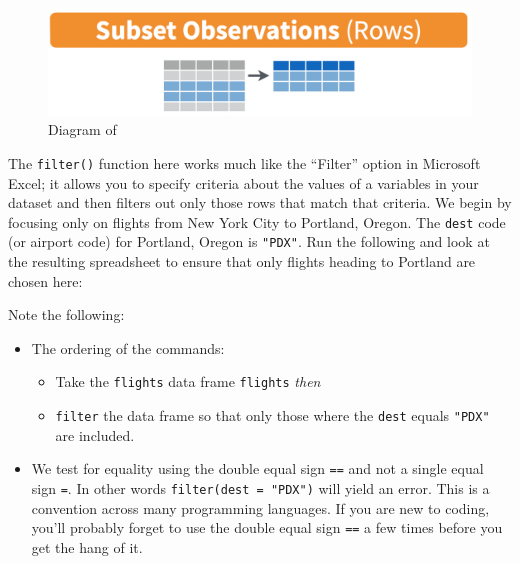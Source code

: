\documentclass[12pt, krantz2,]{krantz}
\makeatletter
\newenvironment{Shaded}{\begin{snugshade}}{\end{snugshade}}
\newcommand{\KeywordTok}[1]{\textcolor[rgb]{0.27,0.27,0.27}{\textbf{#1}}}
\newcommand{\NormalTok}[1]{#1}
\newcommand{\OperatorTok}[1]{\textcolor[rgb]{0.43,0.43,0.43}{\textbf{#1}}}
\newcommand{\StringTok}[1]{\textcolor[rgb]{0.5,0.5,0.5}{#1}}
\providecommand{\tightlist}{%
  \setlength{\itemsep}{0pt}\setlength{\parskip}{0pt}}
\newenvironment{kframe}{%
\medskip{}
\setlength{\fboxsep}{.8em}
 \def\at@end@of@kframe{}%
 \ifinner\ifhmode%
  \def\at@end@of@kframe{\end{minipage}}%
  \begin{minipage}{\columnwidth}%
 \fi\fi%
 \def\FrameCommand##1{\hskip\@totalleftmargin \hskip-\fboxsep
 \colorbox{shadecolor}{##1}\hskip-\fboxsep
     \hskip-\linewidth \hskip-\@totalleftmargin \hskip\columnwidth}%
 \MakeFramed {\advance\hsize-\width
   \@totalleftmargin\z@ \linewidth\hsize
   \@setminipage}}%
 {\par\unskip\endMakeFramed%
 \at@end@of@kframe}
\renewenvironment{Shaded}{\begin{kframe}}{\end{kframe}}
\makeatother
\begin{document}
\begin{figure}

{\centering \includegraphics[width=\textwidth]{images/filter} 

}

\caption{Diagram of }\label{fig:filter}
\end{figure}

The \texttt{filter()} function here works much like the ``Filter'' option in Microsoft Excel; it allows you to specify criteria about the values of a variables in your dataset and then filters out only those rows that match that criteria. We begin by focusing only on flights from New York City to Portland, Oregon. The \texttt{dest} code (or airport code) for Portland, Oregon is \texttt{"PDX"}. Run the following and look at the resulting spreadsheet to ensure that only flights heading to Portland are chosen here:

\begin{Shaded}
\end{Shaded}

Note the following:

\begin{itemize}
\tightlist
\item
  The ordering of the commands:

  \begin{itemize}
  \tightlist
  \item
    Take the \texttt{flights} data frame \texttt{flights} \emph{then}
  \item
    \texttt{filter} the data frame so that only those where the \texttt{dest} equals \texttt{"PDX"} are included.
  \end{itemize}
\item
  We test for equality using the double equal sign \texttt{==} and not a single equal sign \texttt{=}. In other words \texttt{filter(dest\ =\ "PDX")} will yield an error. This is a convention across many programming languages. If you are new to coding, you'll probably forget to use the double equal sign \texttt{==} a few times before you get the hang of it.
\end{itemize}
\end{document}
